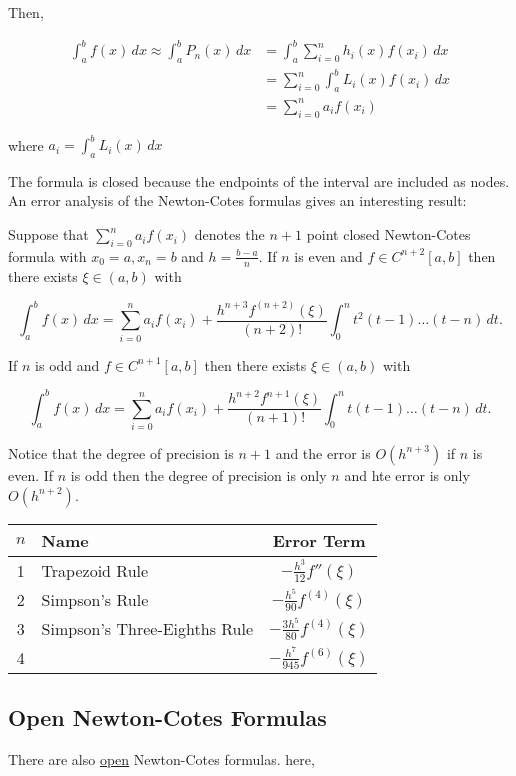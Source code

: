 \noindent
Then,

\begin{align*}
  \int_{a}^{b} f(x) \, dx \approx \int_{a}^{b} P_n(x) \, dx 
  &= \int_{a}^{b} \sum_{i=0}^{n} h_i(x)f(x_i) \, dx \\
  &= \sum_{i = 0}^{n} \int_{a}^{b} L_i(x)f(x_i) \, dx \\
  &= \sum_{i = 0}^{n} a_i f(x_i)
\end{align*}

where $\displaystyle a_i = \int_{a}^{b} L_i(x) \, dx$

The formula is closed because the endpoints of the interval are included as
nodes. An error analysis of the Newton-Cotes formulas gives an interesting
result:

\thm Suppose that $\displaystyle \sum_{i = 0}^{n} a_if(x_i)$ denotes the $n+1$
point closed Newton-Cotes formula with $x_0=a, x_n=b$ and $h = \frac{b-a}{n}$.
If $n$ is even and $f\in C^{n+2}[a,b]$ then there exists $\xi \in (a,b)$ with 

\[
\int_{a}^{b} f(x) \, dx = \sum_{i = 0}^{n} a_if(x_i) +
\frac{h^{n+3}f^{(n+2)}(\xi)}{(n+2)!} \int_{0}^{n} t^2(t-1)\dots (t-n) \, dt
.\]

If $n$ is odd and $f\in C^{n+1}[a,b]$ then there exists $\xi \in (a,b)$ with

\[
  \int_{a}^{b} f(x) \, dx = \sum_{i = 0}^{n} a_if(x_i) +
  \frac{h^{n+2}f^{n+1}(\xi)}{(n+1)!} \int_{0}^{n} t(t-1)\dots(t-n) \, dt
.\]

Notice that the degree of precision is $n+1$ and the error is $O(h^{n+3})$ if
$n$ is even. If $n$ is odd then the degree of precision is only $n$ and hte
error is only $O(h^{n+2})$.

\begin{center}
  \begin{tabular}{c|l c}
    $n$ & \textbf{Name} & \textbf{Error Term} \\
    \hline
    1 & Trapezoid Rule & $-\frac{h^3}{12} f''(\xi)$ \\
    2 & Simpson's Rule & $-\frac{h^5}{90} f^{(4)}(\xi)$ \\
    3 & Simpson's Three-Eighths Rule & $-\frac{3h^5}{80} f^{(4)}(\xi)$ \\
    4 & & $-\frac{h^7}{945} f^{(6)}(\xi)$ \\
  \end{tabular}
\end{center}

\subsection{Open Newton-Cotes Formulas}
\label{sec:open_newton_cotes_formulas}
There are also \uline{open} Newton-Cotes formulas. here,

